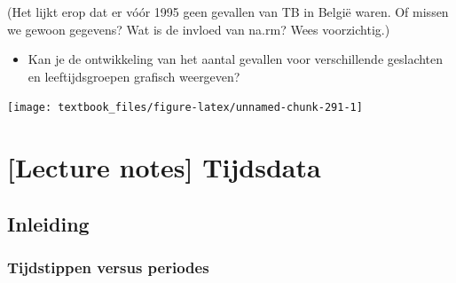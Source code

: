 \documentclass[]{tufte-book}
\newenvironment{Shaded}{}{}
\newcommand{\DataTypeTok}[1]{\textcolor[rgb]{0.56,0.13,0.00}{#1}}
\newcommand{\DecValTok}[1]{\textcolor[rgb]{0.25,0.63,0.44}{#1}}
\newcommand{\KeywordTok}[1]{\textcolor[rgb]{0.00,0.44,0.13}{\textbf{#1}}}
\newcommand{\NormalTok}[1]{#1}
\newcommand{\OperatorTok}[1]{\textcolor[rgb]{0.40,0.40,0.40}{#1}}
\newcommand{\StringTok}[1]{\textcolor[rgb]{0.25,0.44,0.63}{#1}}
\providecommand{\tightlist}{%
  \setlength{\itemsep}{0pt}\setlength{\parskip}{0pt}}
\begin{document}
(Het lijkt erop dat er vóór 1995 geen gevallen van TB in België waren. Of missen we gewoon gegevens? Wat is de invloed van na.rm? Wees voorzichtig.)

\begin{itemize}
\tightlist
\item
  Kan je de ontwikkeling van het aantal gevallen voor verschillende geslachten en leeftijdsgroepen grafisch weergeven?
\end{itemize}

\begin{Shaded}
\end{Shaded}

\texttt{[image: textbook\_files/figure-latex/unnamed-chunk-291-1]}

\hypertarget{lecture-notes-tijdsdata}{%
\chapter{{[}Lecture notes{]} Tijdsdata}\label{lecture-notes-tijdsdata}}

\hypertarget{inleiding-2}{%
\section{Inleiding}\label{inleiding-2}}

\hypertarget{tijdstippen-versus-periodes}{%
\subsection{Tijdstippen versus periodes}\label{tijdstippen-versus-periodes}}
\end{document}
